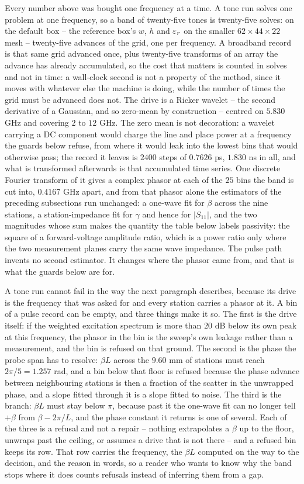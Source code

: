 Every number above was bought one frequency at a time. A tone run solves one problem at one frequency, so a band
of twenty-five tones is twenty-five solves: on the default box -- the reference box's $w$, $h$ and $\varepsilon_r$ on the
smaller $62\times44\times22$ mesh -- twenty-five advances of the grid, one per frequency. A broadband record is
that same grid advanced once, plus twenty-five transforms of an array the advance has already accumulated, so the
cost that matters is counted in solves and not in time: a wall-clock second is not a property of the method, since
it moves with whatever else the machine is doing, while the number of times the grid must be advanced does not.
The drive is a Ricker wavelet -- the second derivative of a Gaussian, and so zero-mean by construction -- centred
on $5.830$ GHz and covering $2$ to $12$ GHz. The zero mean is not decoration: a wavelet carrying a DC component
would charge the line and place power at a frequency the guards below refuse, from where it would leak into the
lowest bins that would otherwise pass; the record it leaves is $2400$ steps of $0.7626$ ps, $1.830$ ns in all,
and what is transformed afterwards is that accumulated time series. One discrete Fourier transform of it gives a complex phasor at each of
the $25$ bins the band is cut into, $0.4167$ GHz apart, and from that phasor alone the estimators of the preceding
subsections run unchanged: a one-wave fit for $\beta$ across the nine stations, a station-impedance fit for
$\gamma$ and hence for $|S_{11}|$, and the two magnitudes whose sum makes the quantity the table below labels passivity: the square of a forward-voltage amplitude ratio, which is a power ratio only where the two measurement planes carry the same wave impedance. The pulse path invents no
second estimator. It changes where the phasor came from, and that is what the guards below are for.

A tone run cannot fail in the way the next paragraph describes, because its drive is the frequency that was asked
for and every station carries a phasor at it. A bin of a pulse record can be empty, and three things make it so.
The first is the drive itself: if the weighted excitation spectrum is more than $20$ dB below its own peak at this
frequency, the phasor in the bin is the sweep's own leakage rather than a measurement, and the bin is refused on
that ground. The second is the phase the probe span has to resolve: $\beta L$ across the $9.60$ mm of stations
must reach $2\pi/5 = 1.257$ rad, and a bin below that floor is refused because the phase advance between
neighbouring stations is then a fraction of the scatter in the unwrapped phase, and a slope fitted through it is a
slope fitted to noise. The third is the branch: $\beta L$ must stay below $\pi$, because past it the one-wave fit
can no longer tell $+\beta$ from $\beta - 2\pi/L$, and the phase constant it returns is one of several. Each of the
three is a refusal and not a repair -- nothing extrapolates a $\beta$ up to the floor, unwraps past the ceiling, or
assumes a drive that is not there -- and a refused bin keeps its row. That row carries the frequency, the $\beta L$
computed on the way to the decision, and the reason in words, so a reader who wants to know why the band stops
where it does counts refusals instead of inferring them from a gap.

